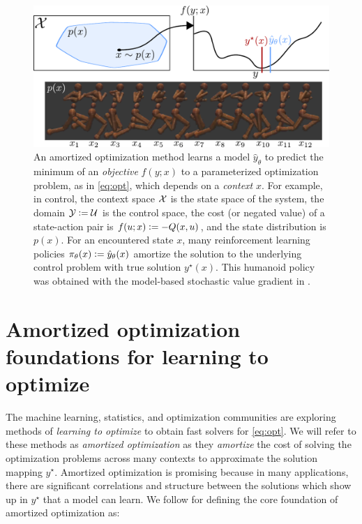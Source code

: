 \documentclass[twoside,11pt]{article}
\begin{document}
\begin{figure}[t]
  \centering
  \includegraphics[width=\textwidth]{fig/overview.pdf}
  \caption{An amortized optimization method learns
    a model $\hat y_\theta$ to predict the minimum
    of an \emph{objective} $f(y;x)$ to a parameterized
    optimization problem, as in \cref{eq:opt},
    which depends on a \emph{context} $x$.
    For example, in control,
    the context space ${\mathcal{X}}$ is the state space of the system,
    the domain ${\mathcal{Y}}\vcentcolon={\mathcal{U}}$ is the control space,
    the cost (or negated value) of a state-action
    pair is $f(u; x)\vcentcolon= -Q(x,u)$, and the state distribution is $p(x)$.
    For an encountered state $x$,
    many reinforcement learning policies $\pi_\theta(x)\vcentcolon=\hat y_\theta(x)$
    amortize the solution to the underlying control problem
    with true solution $y^\star(x)$.
    This humanoid policy was obtained with the model-based
    stochastic value gradient in \citet{amos2021model}.
  }
  \label{fig:overview}
\end{figure}

\section{Amortized optimization foundations for learning to optimize}
The machine learning, statistics, and optimization
communities are exploring methods of \emph{learning
to optimize} to obtain fast solvers for \cref{eq:opt}.
We will refer to these methods as \emph{amortized optimization}
as they \emph{amortize} the cost of solving the
optimization problems across many contexts to approximate
the solution mapping $y^\star$.
Amortized optimization is promising because in many applications,
there are significant correlations and structure between the
solutions which show up in $y^\star$ that a model can learn.
We follow \citet{shu2017amortized} for defining the core
foundation of amortized optimization as:
\end{document}
